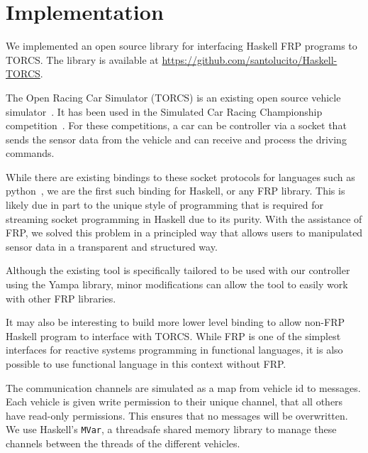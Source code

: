 \section{Implementation}

We implemented an open source library for interfacing Haskell FRP programs to TORCS.
The library is available at \url{https://github.com/santolucito/Haskell-TORCS}.

The Open Racing Car Simulator (TORCS) is an existing open source vehicle simulator~\cite{torcs}.
It has been used in the Simulated Car Racing Championship competition~\cite{SCRC}.
For these competitions, a car can be controller via a socket that sends the sensor data from the vehicle and can receive and process the driving commands.


While there are existing bindings to these socket protocols for languages such as python~\cite{snakeoil,pyscrc}, we are the first such binding for Haskell, or any FRP library.
This is likely due in part to the unique style of programming that is required for streaming socket programming in Haskell due to its purity.
With the assistance of FRP, we solved this problem in a principled way that allows users to manipulated sensor data in a transparent and structured way.


Although the existing tool is specifically tailored to be used with our controller using the Yampa library,
  minor modifications can allow the tool to easily work with other FRP libraries.

It may also be interesting to build more lower level binding to allow non-FRP Haskell program to interface with TORCS.
While FRP is one of the simplest interfaces for reactive systems programming in functional languages, it is also possible to use functional language in this context without FRP.


The communication channels are simulated as a map from vehicle id to messages.
Each vehicle is given write permission to their unique channel, that all others have read-only permissions.
This ensures that no messages will be overwritten.
We use Haskell's \texttt{MVar}, a threadsafe shared memory library to manage these channels between the threads of the different vehicles.
